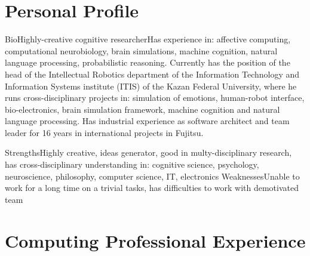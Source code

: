 \documentclass{moderncv}
\begin{document}
\makecvtitle

 
\section{Personal Profile}

\cventry
{Bio}{Highly-creative cognitive researcher}{}{}{}{Has experience in: affective computing, computational neurobiology, brain simulations, machine cognition, natural language processing, probabilistic reasoning. Currently has the position of the head of the Intellectual Robotics department of the Information Technology and Information Systems institute (ITIS) of the Kazan Federal University, where he runs cross-disciplinary projects in: simulation of emotions, human-robot interface, bio-electronics, brain simulation framework, machine cognition and natural language processing. Has industrial experience as software architect and team leader for 16 years in international projects in Fujitsu.}

\cvcomputer
{Strengths}{Highly creative, ideas generator, good in multy-disciplinary research, has cross-disciplinary understanding in: cognitive science, psychology, neuroscience, philosophy, computer science, IT, electronics}
{Weaknesses}{Unable to work for a long time on a trivial tasks, has difficulties to work with demotivated team}

\section{Computing Professional Experience}

\end{document}
